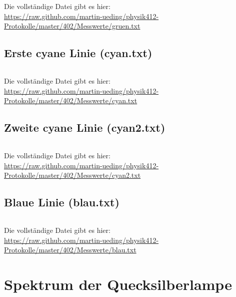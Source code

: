 \begin{appendix}
    Die vollständige Datei gibt es hier: \\
    \url{https://raw.github.com/martin-ueding/physik412-Protokolle/master/402/Messwerte/gruen.txt}

    \subsection{Erste cyane Linie (cyan.txt)}
    \begin{multicols}{5}
        \inputminted[tabsize=4, firstline=<< cyan_lower >>, lastline=<< cyan_upper >>, fontsize=\footnotesize]{text}{../Messwerte/cyan.txt}
    \end{multicols}

    Die vollständige Datei gibt es hier: \\
    \url{https://raw.github.com/martin-ueding/physik412-Protokolle/master/402/Messwerte/cyan.txt}

    \subsection{Zweite cyane Linie (cyan2.txt)}
    \begin{multicols}{5}
        \inputminted[tabsize=4, firstline=<< cyan2_lower >>, lastline=<< cyan2_upper >>, fontsize=\footnotesize]{text}{../Messwerte/cyan2.txt}
    \end{multicols}

    Die vollständige Datei gibt es hier: \\
    \url{https://raw.github.com/martin-ueding/physik412-Protokolle/master/402/Messwerte/cyan2.txt}

    \subsection{Blaue Linie (blau.txt)}
    \begin{multicols}{5}
        \inputminted[tabsize=4, firstline=<< blau_lower >>, lastline=<< blau_upper >>, fontsize=\footnotesize]{text}{../Messwerte/blau.txt}
    \end{multicols}

    Die vollständige Datei gibt es hier: \\
    \url{https://raw.github.com/martin-ueding/physik412-Protokolle/master/402/Messwerte/blau.txt}

    \section{Spektrum der Quecksilberlampe}
    \label{sec:spektrum}


\end{appendix}
